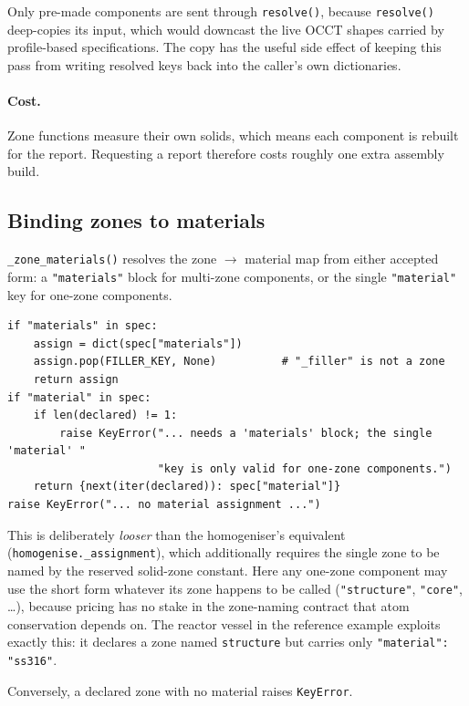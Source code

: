 \documentclass[9pt,a4paper]{extarticle}
\newcommand{\code}[1]{\texttt{\small #1}}
\begin{document}
Only pre-made components are sent through \code{resolve()}, because
\code{resolve()} deep-copies its input, which would downcast the live OCCT
shapes carried by profile-based specifications. The copy has the useful side
effect of keeping this pass from writing resolved keys back into the caller's
own dictionaries.

\paragraph{Cost.} Zone functions measure their own solids, which means each
component is rebuilt for the report. Requesting a report therefore costs roughly
one extra assembly build.

\subsection{Binding zones to materials}

\code{\_zone\_materials()} resolves the zone $\rightarrow$ material map from
either accepted form: a \code{"materials"} block for multi-zone components, or
the single \code{"material"} key for one-zone components.

\begin{lstlisting}[style=py]
if "materials" in spec:
    assign = dict(spec["materials"])
    assign.pop(FILLER_KEY, None)          # "_filler" is not a zone
    return assign
if "material" in spec:
    if len(declared) != 1:
        raise KeyError("... needs a 'materials' block; the single 'material' "
                       "key is only valid for one-zone components.")
    return {next(iter(declared)): spec["material"]}
raise KeyError("... no material assignment ...")
\end{lstlisting}

This is deliberately \emph{looser} than the homogeniser's equivalent
(\code{homogenise.\_assignment}), which additionally requires the single zone to
be named by the reserved solid-zone constant. Here any one-zone component may
use the short form whatever its zone happens to be called
(\code{"structure"}, \code{"core"}, \dots), because pricing has no stake in the
zone-naming contract that atom conservation depends on. The reactor vessel in
the reference example exploits exactly this: it declares a zone named
\code{structure} but carries only \code{"material": "ss316"}.

Conversely, a declared zone with no material raises \code{KeyError}.

\end{document}
